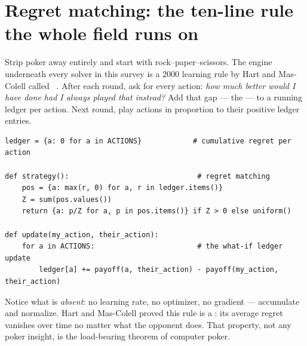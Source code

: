 \section{Regret matching: the ten-line rule the whole field runs on}\label{sec:rm}

Strip poker away entirely and start with rock--paper--scissors. The engine underneath every solver in this survey is a 2000 learning rule by Hart and Mas-Colell called ~\cite{hart2000}. After each round, ask for every action: \emph{how much better would I have done had I always played that instead?} Add that gap --- the  --- to a running ledger per action. Next round, play actions in proportion to their positive ledger entries.

\begin{lstlisting}
ledger = {a: 0 for a in ACTIONS}            # cumulative regret per action

def strategy():                              # regret matching
    pos = {a: max(r, 0) for a, r in ledger.items()}
    Z = sum(pos.values())
    return {a: p/Z for a, p in pos.items()} if Z > 0 else uniform()

def update(my_action, their_action):
    for a in ACTIONS:                        # the what-if ledger update
        ledger[a] += payoff(a, their_action) - payoff(my_action, their_action)
\end{lstlisting}

Notice what is \emph{absent}: no learning rate, no optimizer, no gradient --- accumulate and normalize. Hart and Mas-Colell proved this rule is a : its average regret vanishes over time no matter what the opponent does. That property, not any poker insight, is the load-bearing theorem of computer poker.

